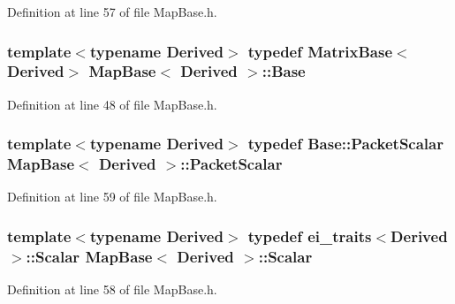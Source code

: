 Definition at line 57 of file Map\-Base.\-h.

\hypertarget{class_map_base_a4e995268eb1db197239d284e956241f9}{
\subsubsection[{Base}]{\setlength{\rightskip}{0pt plus 5cm}template$<$typename Derived$>$ typedef {\bf Matrix\-Base}$<$Derived$>$ {\bf Map\-Base}$<$ Derived $>$\-::{\bf Base}}}\label{class_map_base_a4e995268eb1db197239d284e956241f9}


Definition at line 48 of file Map\-Base.\-h.

\hypertarget{class_map_base_a077d2371608a126a9396c7de40002bad}{
\subsubsection[{Packet\-Scalar}]{\setlength{\rightskip}{0pt plus 5cm}template$<$typename Derived$>$ typedef {\bf Base\-::\-Packet\-Scalar} {\bf Map\-Base}$<$ Derived $>$\-::{\bf Packet\-Scalar}}}\label{class_map_base_a077d2371608a126a9396c7de40002bad}


Definition at line 59 of file Map\-Base.\-h.

\hypertarget{class_map_base_abda8b790105e1c385696bfa2fe7b9c12}{
\subsubsection[{Scalar}]{\setlength{\rightskip}{0pt plus 5cm}template$<$typename Derived$>$ typedef {\bf ei\-\_\-traits}$<$Derived$>$\-::{\bf Scalar} {\bf Map\-Base}$<$ Derived $>$\-::{\bf Scalar}}}\label{class_map_base_abda8b790105e1c385696bfa2fe7b9c12}


Definition at line 58 of file Map\-Base.\-h.




